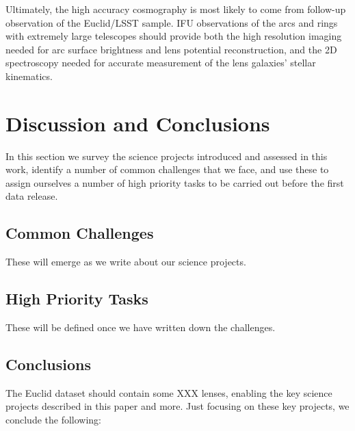 \documentclass[twocolumn]{svjour3}
\begin{document}
Ultimately, the high accuracy cosmography is most likely to come from
follow-up observation of the Euclid/LSST sample. IFU observations of the
arcs and rings with extremely large telescopes should provide both the
high resolution imaging needed for arc surface brightness and lens
potential reconstruction, and the 2D spectroscopy needed for accurate
measurement of the lens galaxies' stellar kinematics.\\




\vspace{30pt}



\section{Discussion and Conclusions}
\label{sec:conclusions}

In this section we survey the science projects introduced and assessed
in this  work, identify a number of common challenges that we face, and
use these to  assign ourselves a number of high priority tasks to be
carried out before the first data release.

\subsection{Common Challenges}

These will emerge as we write about our science projects.


\subsection{High Priority Tasks}

These will be defined once we have written down the challenges.


\subsection{Conclusions}

The Euclid dataset should contain some XXX lenses, enabling the key
science projects described in this paper and more. Just focusing on
these key projects, we conclude the following:
\end{document}

